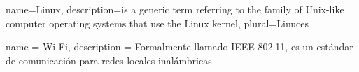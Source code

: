 

{
  	name=Linux,
	    description={is a generic term referring to the family of Unix-like
                computer operating systems that use the Linux kernel},
  	plural=Linuces
}
	
{
	name = Wi-Fi,
	description = {Formalmente llamado IEEE 802.11, es un estándar de comunicación para redes locales inalámbricas}
}

